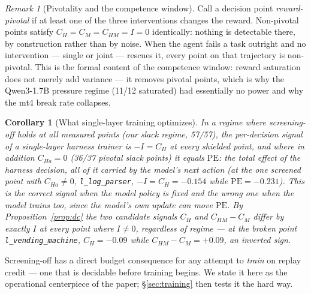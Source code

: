 \documentclass{article}
\newtheorem{corollary}{Corollary}
\theoremstyle{remark}
\newtheorem{remark}{Remark}
\begin{document}
\begin{remark}[Pivotality and the competence window]
\label{rem:pivot}
Call a decision point \emph{reward-pivotal} if at least one of the three
interventions changes the reward. Non-pivotal points satisfy
$C_H = C_M = C_{HM} = I = 0$ identically: nothing is detectable there, by
construction rather than by noise. When the agent fails a task outright and
no intervention --- single or joint --- rescues it, every point on that
trajectory is non-pivotal.
This is the formal content of the competence window: reward saturation does
not merely add variance --- it removes pivotal points, which is why the
Qwen3-1.7B pressure regime (11/12 saturated) had essentially no power and
why the mt4 break rate collapses.
\end{remark}

\begin{corollary}[What single-layer training optimizes]
\label{cor:arm2}
In a regime where screening-off holds at all measured points (our slack
regime, 57/57), the per-decision signal of a single-layer harness trainer is
$-I = C_H$ at every shielded point, and where in addition $C_{Ha} = 0$
(36/37 pivotal slack points) it equals $\mathrm{PE}$: the total effect of
the harness decision, all of it carried by the model's next action (at the
one screened point with $C_{Ha} \neq 0$, \texttt{l\_log\_parser}, $-I =
C_H = -0.154$ while $\mathrm{PE} = -0.231$). This is
the correct signal when the model policy is fixed and the wrong one when
the model trains too, since the model's own update can move
$\mathrm{PE}$. By Proposition~\ref{prop:dc} the two candidate signals
$C_H$ and $C_{HM} - C_M$ differ by exactly $I$ at \emph{every} point
where $I \neq 0$, regardless of regime --- at the broken point
\texttt{l\_vending\_machine}, $C_H = -0.09$ while $C_{HM} - C_M =
+0.09$, an inverted sign.
\end{corollary}

Screening-off has a direct budget consequence for any attempt to
\emph{train} on replay credit --- one that is decidable before training
begins. We state it here as the operational centerpiece of the paper;
\S\ref{sec:training} then tests it the hard way.
\end{document}
